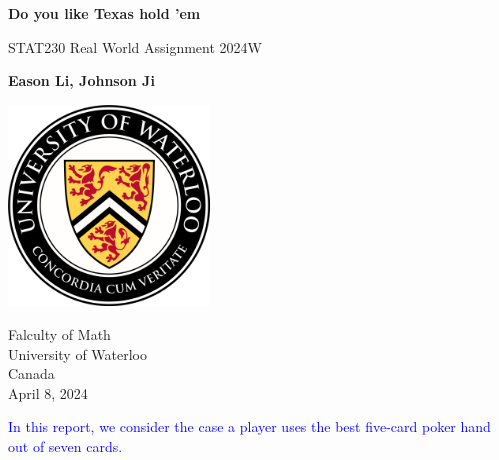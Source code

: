 \documentclass{article}
\begin{document}
\begin{titlepage}
    \begin{center}
        \vspace*{0.6cm}
            
        \Huge
        \textbf{Do you like Texas hold 'em}
            
        \vspace{0.5cm}
        \LARGE
        STAT230 Real World Assignment 2024W
            
        \vspace{1.5cm}
            
        \textbf{Eason Li, Johnson Ji}
            
        \vspace{3.6cm}
        
        \begin{center}
            \includegraphics[width = 0.4\textwidth]{UofLoo.png}
        \end{center}

        \vspace{0.4cm}
            
        \Large
        Falculty of Math \\
        University of Waterloo \\
        Canada \\
        April 8, 2024
    \end{center}
\end{titlepage}

\newpage

\begin{center}
    \textcolor{blue}{
        In this report, we consider the case a player uses the best 
        five-card poker hand out of seven cards.
    }
\end{center}
\end{document}
